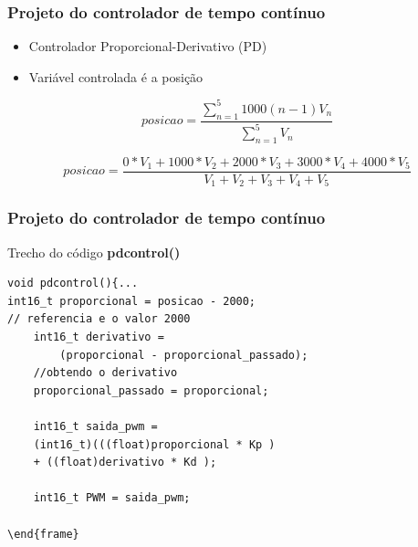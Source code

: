 \begin{frame}
\frametitle{Projeto do controlador de tempo contínuo}

\begin{itemize}
\item Controlador Proporcional-Derivativo (PD)
\item Variável controlada é a posição
\end{itemize}

\begin{equation}\label{eq:posicao}
posicao = \frac{\sum_{n=1}^{5} 1000(n-1)V_{n}}{\sum_{n=1}^{5} V_{n}}
\end{equation}

\begin{equation}\label{eq:posicao2}
posicao = \frac{0*V_{1} + 1000*V_{2} + 2000*V_{3} + 3000*V_{4} + 4000*V_{5} }{V_{1} + V_{2} + V_{3} + V_{4} + V_{5}}
\end{equation}

\end{frame}


%


\begin{frame}[fragile] %
\frametitle{Projeto do controlador de tempo contínuo}
\begin{block}{Trecho do código \textbf{pdcontrol()}}


\begin{verbatim}
void pdcontrol(){...
int16_t proporcional = posicao - 2000; 
// referencia e o valor 2000
	int16_t derivativo = 
		(proporcional - proporcional_passado); 
	//obtendo o derivativo
	proporcional_passado = proporcional;

	int16_t saida_pwm = 
	(int16_t)(((float)proporcional * Kp ) 
	+ ((float)derivativo * Kd );

	int16_t PWM = saida_pwm;

\end{frame}\end{verbatim}
\end{block}
\end{frame}

